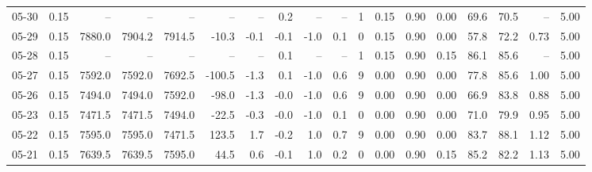 \begin{threeparttable}
{\begin{tabular}{lrrrrrrrrrrrrrrrrr}
  05-30 &     0.15 &     -- &     -- &     -- &         -- &             -- &                       0.2 &                       -- &                  -- &              1 &       0.15 &      0.90 &           0.00 &             69.6 &                70.5 &              -- &                   5.00 \\
  05-29 &     0.15 & 7880.0 & 7904.2 & 7914.5 &      -10.3 &           -0.1 &                      -0.1 &                     -1.0 &                 0.1 &              0 &       0.15 &      0.90 &           0.00 &             57.8 &                72.2 &            0.73 &                   5.00 \\
  05-28 &     0.15 &     -- &     -- &     -- &         -- &             -- &                       0.1 &                       -- &                  -- &              1 &       0.15 &      0.90 &           0.15 &             86.1 &                85.6 &              -- &                   5.00 \\
  05-27 &     0.15 & 7592.0 & 7592.0 & 7692.5 &     -100.5 &           -1.3 &                       0.1 &                     -1.0 &                 0.6 &              9 &       0.00 &      0.90 &           0.00 &             77.8 &                85.6 &            1.00 &                   5.00 \\
  05-26 &     0.15 & 7494.0 & 7494.0 & 7592.0 &      -98.0 &           -1.3 &                      -0.0 &                     -1.0 &                 0.6 &              9 &       0.00 &      0.90 &           0.00 &             66.9 &                83.8 &            0.88 &                   5.00 \\
  05-23 &     0.15 & 7471.5 & 7471.5 & 7494.0 &      -22.5 &           -0.3 &                      -0.0 &                     -1.0 &                 0.1 &              0 &       0.00 &      0.90 &           0.00 &             71.0 &                79.9 &            0.95 &                   5.00 \\
  05-22 &     0.15 & 7595.0 & 7595.0 & 7471.5 &      123.5 &            1.7 &                      -0.2 &                      1.0 &                 0.7 &              9 &       0.00 &      0.90 &           0.00 &             83.7 &                88.1 &            1.12 &                   5.00 \\
  05-21 &     0.15 & 7639.5 & 7639.5 & 7595.0 &       44.5 &            0.6 &                      -0.1 &                      1.0 &                 0.2 &              0 &       0.00 &      0.90 &           0.15 &             85.2 &                82.2 &            1.13 &                   5.00 \\

\end{tabular}}
\end{threeparttable}

